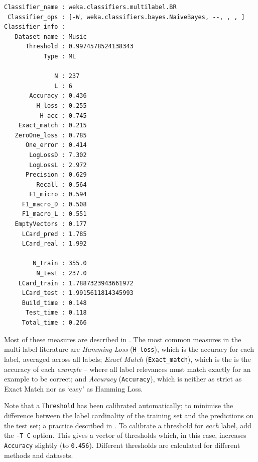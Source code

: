 \documentclass[11pt]{article}
\begin{document}
{\small {}
\begin{verbatim}
Classifier_name : weka.classifiers.multilabel.BR
 Classifier_ops : [-W, weka.classifiers.bayes.NaiveBayes, --, , , ]
Classifier_info : 
   Dataset_name : Music
      Threshold : 0.9974578524138343
           Type : ML

              N : 237
              L : 6    
       Accuracy : 0.436
         H_loss : 0.255
          H_acc : 0.745
    Exact_match : 0.215
   ZeroOne_loss : 0.785
      One_error : 0.414
       LogLossD : 7.302
       LogLossL : 2.972
      Precision : 0.629
         Recall : 0.564
       F1_micro : 0.594
     F1_macro_D : 0.508
     F1_macro_L : 0.551
   EmptyVectors : 0.177
     LCard_pred : 1.785
     LCard_real : 1.992

        N_train : 355.0
         N_test : 237.0
    LCard_train : 1.7887323943661972
     LCard_test : 1.9915611814345993
     Build_time : 0.148
      Test_time : 0.118
     Total_time : 0.266

\end{verbatim}
}

Most of these measures are described in \cite{Thesis,ECC2,MMD}. The most common measures in the multi-label literature are \textit{Hamming Loss} (\texttt{H\_loss}), which is the accuracy for each label, averaged across all labels; \textit{Exact Match} (\texttt{Exact\_match}), which is the is the accuracy of each \emph{example} -- where all label relevances must match exactly for an example to be correct; and \textit{Accuracy} (\texttt{Accuracy}), which is neither as strict as Exact Match nor as `easy' as Hamming Loss.


Note that a \texttt{Threshold} has been calibrated automatically; to minimise the difference between the label cardinality of the training set and the predictions on the test set; a practice described in \cite{ECC2}. To calibrate a threshold for \emph{each} label, add the \texttt{-T C} option. This gives a vector of thresholds which, in this case, increases \texttt{Accuracy} slightly (to \texttt{0.456}). Different thresholds are calculated for different methods and datasets.

\end{document}
